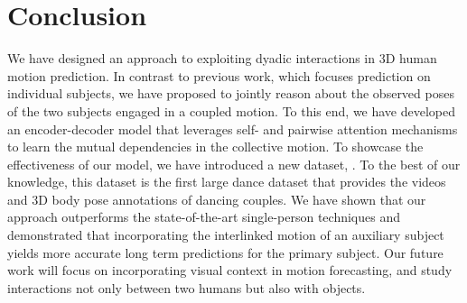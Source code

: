 \section{Conclusion}
We have designed an approach to exploiting dyadic interactions in 3D human motion prediction. In contrast to previous work, which focuses prediction on individual subjects, we have proposed to jointly reason about the observed poses of the two subjects engaged in a coupled motion. To this end, we have developed an encoder-decoder model that leverages self- and pairwise attention mechanisms to learn the mutual dependencies in the collective motion. To showcase the effectiveness of our model, we have introduced a new dataset, \lindyhop{}. To the best of our knowledge, this dataset is the first large dance dataset that provides the videos and 3D body pose annotations of dancing couples. We have shown that our approach outperforms the state-of-the-art single-person techniques and demonstrated that incorporating the interlinked motion of an auxiliary subject yields more accurate long term predictions for the primary subject. Our future work will focus on incorporating visual context in motion forecasting, and study interactions not only between two humans but also  with objects.